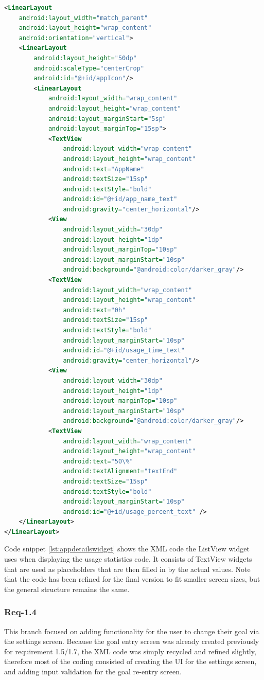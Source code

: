 \documentclass[12pt]{article}
\begin{document}
\begin{lstlisting}[language=XML, style=mystyle, caption={XML code used by the ListView widget for displaying code}, label=lst:appdetailswidget]
<LinearLayout
	android:layout_width="match_parent"
	android:layout_height="wrap_content"
	android:orientation="vertical">
	<LinearLayout
		android:layout_height="50dp"
		android:scaleType="centerCrop"
		android:id="@+id/appIcon"/>
		<LinearLayout
			android:layout_width="wrap_content"
			android:layout_height="wrap_content"
			android:layout_marginStart="5sp"
			android:layout_marginTop="15sp">
			<TextView
				android:layout_width="wrap_content"
				android:layout_height="wrap_content"
				android:text="AppName"
				android:textSize="15sp"
				android:textStyle="bold"
				android:id="@+id/app_name_text"
				android:gravity="center_horizontal"/>
			<View
				android:layout_width="30dp"
				android:layout_height="1dp"
				android:layout_marginTop="10sp"
				android:layout_marginStart="10sp"
				android:background="@android:color/darker_gray"/>
			<TextView
				android:layout_width="wrap_content"
				android:layout_height="wrap_content"
				android:text="0h"
				android:textSize="15sp"
				android:textStyle="bold"
				android:layout_marginStart="10sp"
				android:id="@+id/usage_time_text"
				android:gravity="center_horizontal"/>
			<View
				android:layout_width="30dp"
				android:layout_height="1dp"
				android:layout_marginTop="10sp"
				android:layout_marginStart="10sp"
				android:background="@android:color/darker_gray"/>
			<TextView
				android:layout_width="wrap_content"
				android:layout_height="wrap_content"
				android:text="50\%"
				android:textAlignment="textEnd"
				android:textSize="15sp"
				android:textStyle="bold"
				android:layout_marginStart="10sp"
				android:id="@+id/usage_percent_text" />
	</LinearLayout>
</LinearLayout>
\end{lstlisting}

Code snippet \ref{lst:appdetailswidget} shows the XML code the ListView widget uses when displaying the usage statistics code. It consists of TextView widgets that are used as placeholders that are then
filled in by the actual values. Note that the code has been refined for the final version to fit smaller screen sizes, but the general structure remains the same.

\subsubsection{Req-1.4}
This branch focused on adding functionality for the user to change their goal via the settings screen. Because the goal entry screen was already created previously for requirement 1.5/1.7, the XML
code was simply recycled and refined slightly, therefore most of the coding consisted of creating the UI for the settings screen, and adding input validation for the goal re-entry screen.
\end{document}
